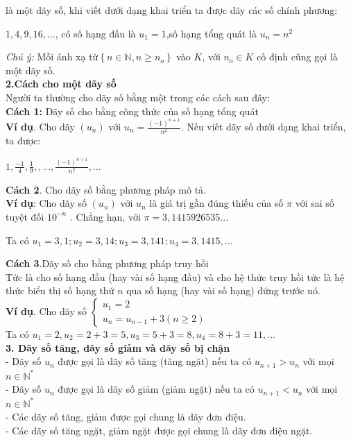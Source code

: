 \documentclass[12pt,oneside,a4paper,reqno]{book}
\begin{document}
là một dãy số, khi viết dưới dạng khai triển ta được dãy các số chính phương:
\begin{center}
$1, 4, 9, 16, ...$, có số hạng đầu là $u_1=1$,số hạng tổng quát là $u_n=n^2$
\end{center}
\textit{Chú ý:} Mỗi ánh xạ từ$ \left\{n \in \mathbb N, n \ge n_o\right\}$ vào $K$, với $n_o \in K$ cố định cũng gọi là một dãy số.\\
{\bf 2.Cách cho một dãy số}\\
Người ta thường cho dãy số bằng một trong các cách sau đây:\\
{\bf Cách 1:} Dãy số cho bằng công thức của số hạng tổng quát\\
{\bf Ví dụ}. Cho dãy $(u_n)$ với $u_n=\frac{(-1)^{n+1}}{n^2}$. Nếu viết dãy số dưới dạng khai triển, ta được:
\begin{center}
$1, \frac{-1}{4}, \frac{1}{9}, ,..., \frac{(-1)^{n+1}}{n^2}, ...$
\end{center}
{\bf Cách 2}. Cho dãy số bằng phương pháp mô tả.\\
{\bf Ví dụ}: Cho dãy số $(u_n)$ với $u_n$ là giá trị gần đúng thiếu của số $ \pi$ với sai số tuyệt đối ${10}^{-n}$ .
Chẳng hạn, với $ \pi=3,1415926535...$
\begin{center}
Ta có $u_1=3,1 ; u_2=3,14 ; u_3=3,141 ; u_4=3,1415,... $
\end{center}
{\bf Cách 3}.Dãy số cho bằng phương pháp truy hồi\\
Tức là cho số hạng đầu (hay vài số hạng đầu) và cho hệ thức truy hồi tức là hệ thức biểu thị số hạng thứ $n$ qua số hạng (hay vài số hạng) đứng trước nó.\\
{\bf Ví dụ}. Cho dãy số 
$\left\{ \begin{array}{l}
u_1=2\\
u_n=u_{n-1}+3 (n \ge 2)                          
\end{array} \right.$\\
Ta có $u_1=2, u_2=2+3=5, u_3=5+3=8, u_4=8+3=11, ... $\\
{\bf3. Dãy số tăng, dãy số giảm và dãy số bị chặn}\\
- Dãy số $u_n$ được gọi là dãy số tăng (tăng ngặt) nếu ta có $u_{n+1} > u_n$ với mọi $n \in \mathbb{N}^*$\\
- Dãy số $u_n$ được gọi là dãy số giảm (giảm ngặt) nếu ta có $u_{n+1} < u_n$ với mọi $n \in \mathbb{N}^*$\\
- Các dãy số tăng, giảm được gọi chung là dãy đơn điệu.\\
- Các dãy số tăng ngặt, giảm ngặt được gọi chung là dãy đơn điệu ngặt.\\
\end{document}
